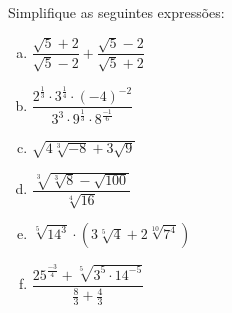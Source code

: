 \begin{exer}
Simplifique as seguintes expressões:
\begin{multicols}{2}
\begin{enumerate}[a)]
\item $\dfrac{\sqrt{5} + 2}{\sqrt{5} - 2} + \dfrac{\sqrt{5} - 2}{\sqrt{5} + 2}$
\item $\dfrac{2^{\frac{1}{3}} \cdot 3^{\frac{1}{4}} \cdot (-4)^{-2}}{3^3 \cdot 9^{\frac{1}{3}} \cdot 8^{\frac{-1}{6}}}$
\item $\sqrt{4 \sqrt[3]{-8}+3\sqrt{9}}$
\item $\dfrac{\sqrt[3]{\sqrt[3]{8} - \sqrt{100}}}{\sqrt[4]{16}}$
\item $\sqrt[5]{14^3} \cdot (3\sqrt[5]{4} + 2 \sqrt[10]{7^4})$
\item $\dfrac{25^{\frac{-3}{4}} + \sqrt[5]{3^5 \cdot 14^{-5}}}{\frac{8}{3} + \frac{4}{3}}$
\end{enumerate}
\end{multicols}
\end{exer}
\begin{resp}
  \construirResp
\end{resp}
